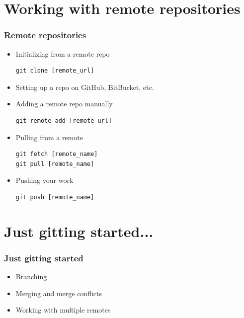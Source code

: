 \documentclass[10pt,t,sans,mathsans,xcolor=dvipsnames]{beamer}
\begin{document}
\section{Working with remote repositories}
\begin{frame}
\frametitle{Remote repositories}
\begin{itemize}
\item Initializing from a remote repo
\begin{lstlisting}
git clone [remote_url]
\end{lstlisting}
\item Setting up a repo on GitHub, BitBucket, etc.
\item Adding a remote repo manually
\begin{lstlisting}
git remote add [remote_url]
\end{lstlisting}
\item Pulling from a remote
\begin{lstlisting}
git fetch [remote_name]
git pull [remote_name]
\end{lstlisting}
\item Pushing your work
\begin{lstlisting}
git push [remote_name]
\end{lstlisting}
\end{itemize}
\end{frame}
\section{Just gitting started...}
\begin{frame}[fragile]%
\frametitle{Just gitting started}
\begin{itemize}
\item Branching
\item Merging and merge conflicts
\item Working with multiple remotes
\end{itemize}
\end{frame}
\end{document}

